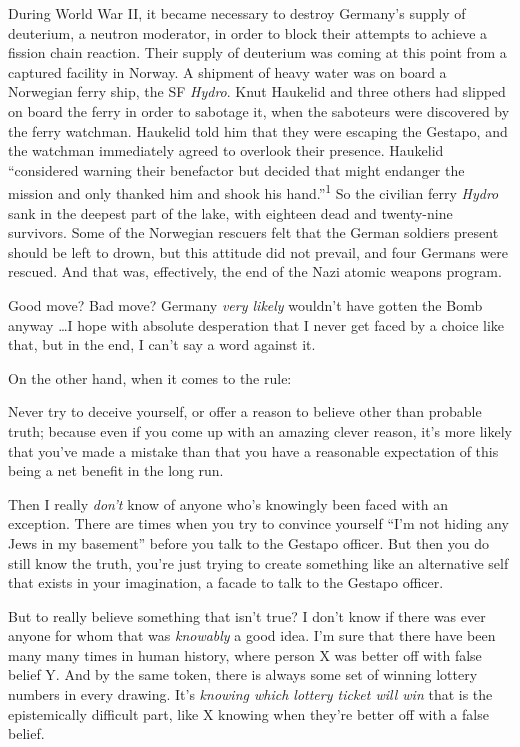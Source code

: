 {
 During World War II, it became necessary to destroy
Germany's supply of deuterium, a neutron moderator, in
order to block their attempts to achieve a fission chain reaction.
Their supply of deuterium was coming at this point from a captured
facility in Norway. A shipment of heavy water was on board a Norwegian
ferry ship, the SF \textit{Hydro}. Knut Haukelid and three others had
slipped on board the ferry in order to sabotage it, when the saboteurs
were discovered by the ferry watchman. Haukelid told him that they were
escaping the Gestapo, and the watchman immediately agreed to overlook
their presence. Haukelid ``considered warning their
benefactor but decided that might endanger the mission and only thanked
him and shook his hand.''\textsuperscript{1} So the
civilian ferry \textit{Hydro} sank in the deepest part of the lake,
with eighteen dead and twenty-nine survivors. Some of the Norwegian
rescuers felt that the German soldiers present should be left to drown,
but this attitude did not prevail, and four Germans were rescued. And
that was, effectively, the end of the Nazi atomic weapons program.}

{
 Good move? Bad move? Germany \textit{very likely}
wouldn't have gotten the Bomb anyway \ldots I hope with
absolute desperation that I never get faced by a choice like that, but
in the end, I can't say a word against it.}

{
 On the other hand, when it comes to the rule:}

{
 Never try to deceive yourself, or offer a reason to believe other
than probable truth; because even if you come up with an amazing clever
reason, it's more likely that you've
made a mistake than that you have a reasonable expectation of this
being a net benefit in the long run.}

{
 Then I really \textit{don't} know of anyone
who's knowingly been faced with an exception. There are
times when you try to convince yourself
``I'm not hiding any Jews in my
basement'' before you talk to the Gestapo officer.
But then you do still know the truth, you're just
trying to create something like an alternative self that exists in your
imagination, a facade to talk to the Gestapo officer.}

{
 But to really believe something that isn't true? I
don't know if there was ever anyone for whom that was
\textit{knowably} a good idea. I'm sure that there have
been many many times in human history, where person X was better off
with false belief Y. And by the same token, there is always some set of
winning lottery numbers in every drawing. It's
\textit{knowing which lottery ticket will win} that is the
epistemically difficult part, like X knowing when
they're better off with a false belief.}

